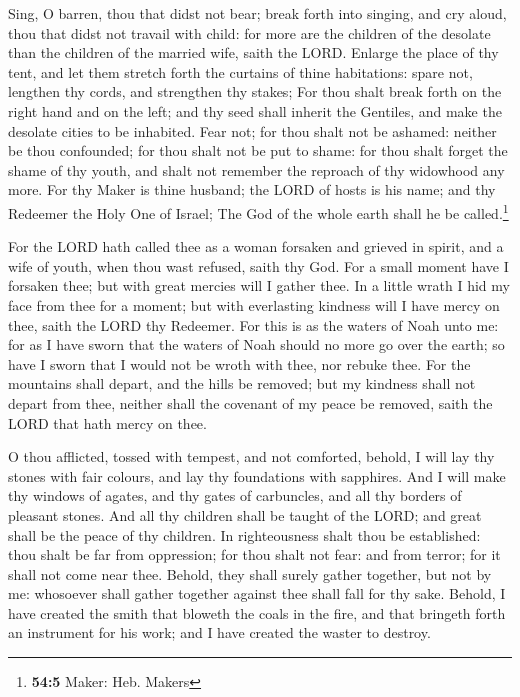  Sing, O barren, thou that didst not bear; break forth
into singing, and cry aloud, thou that didst not travail with child: for
more are the children of the desolate than the children of the married
wife, saith the LORD.  Enlarge the place of thy tent, and
let them stretch forth the curtains of thine habitations: spare not,
lengthen thy cords, and strengthen thy stakes;  For thou
shalt break forth on the right hand and on the left; and thy seed shall
inherit the Gentiles, and make the desolate cities to be inhabited.
 Fear not; for thou shalt not be ashamed: neither be thou
confounded; for thou shalt not be put to shame: for thou shalt forget
the shame of thy youth, and shalt not remember the reproach of thy
widowhood any more.  For thy Maker is thine husband; the
LORD of hosts is his name; and thy Redeemer the Holy One of Israel; The
God of the whole earth shall he be called.\footnote{\textbf{54:5} Maker:
  Heb. Makers}

 For the LORD hath called thee as a woman forsaken and
grieved in spirit, and a wife of youth, when thou wast refused, saith
thy God.  For a small moment have I forsaken thee; but
with great mercies will I gather thee.  In a little wrath
I hid my face from thee for a moment; but with everlasting kindness will
I have mercy on thee, saith the LORD thy Redeemer.  For
this is as the waters of Noah unto me: for as I have sworn that the
waters of Noah should no more go over the earth; so have I sworn that I
would not be wroth with thee, nor rebuke thee.  For the
mountains shall depart, and the hills be removed; but my kindness shall
not depart from thee, neither shall the covenant of my peace be removed,
saith the LORD that hath mercy on thee.

 O thou afflicted, tossed with tempest, and not
comforted, behold, I will lay thy stones with fair colours, and lay thy
foundations with sapphires.  And I will make thy windows
of agates, and thy gates of carbuncles, and all thy borders of pleasant
stones.  And all thy children shall be taught of the
LORD; and great shall be the peace of thy children.  In
righteousness shalt thou be established: thou shalt be far from
oppression; for thou shalt not fear: and from terror; for it shall not
come near thee.  Behold, they shall surely gather
together, but not by me: whosoever shall gather together against thee
shall fall for thy sake.  Behold, I have created the
smith that bloweth the coals in the fire, and that bringeth forth an
instrument for his work; and I have created the waster to destroy.

